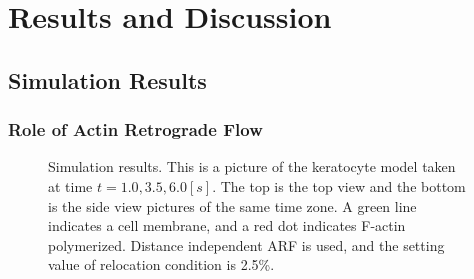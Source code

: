 \documentclass[a4paper,12pt]{book}
\begin{document}
\chapter{Results and Discussion}
\section{Simulation Results}
\subsection{Role of Actin Retrograde Flow}
\begin{figure}[tbp]
 \caption{Simulation results. This is a picture of the keratocyte model taken at time $t = 1.0, 3.5, 6.0 [s]$. The top is the top view and the bottom is the side view pictures of the same time zone. A green line indicates a cell membrane, and a red dot indicates F-actin polymerized. Distance independent ARF is used, and the setting value of relocation condition is 2.5\%.}
 \label{fig:res0}
\end{figure}
\end{document}
